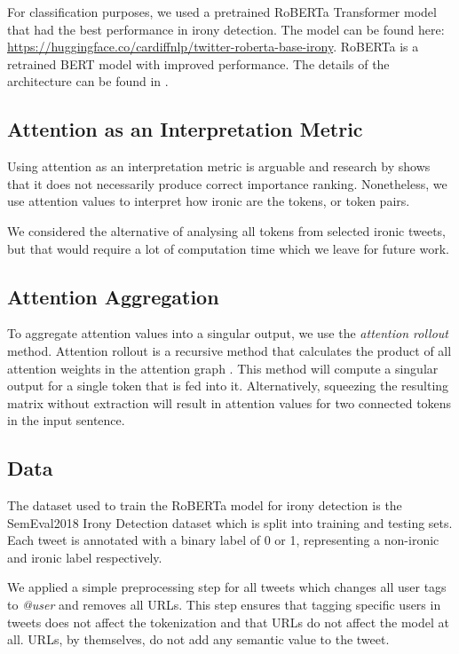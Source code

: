 \documentclass[10pt, a4paper]{article}
\begin{document}
For classification purposes, we used a pretrained RoBERTa Transformer model that had the best performance in irony detection.
The model can be found here: \url{https://huggingface.co/cardiffnlp/twitter-roberta-base-irony}.
RoBERTa is a retrained BERT model with improved performance. The details of the architecture can be found in \citep{roberta}. 

\subsection{Attention as an Interpretation Metric}

Using attention as an interpretation metric is arguable and research by \cite{attention-interpretable} shows that it does not necessarily produce correct importance ranking.
Nonetheless, we use attention values to interpret how ironic are the tokens, or token pairs.

We considered the alternative of analysing all tokens from selected ironic tweets, but that would require a lot of computation time which we leave for future work.

\subsection{Attention Aggregation}
\label{sec:attaggr}

To aggregate attention values into a singular output, we use the \textit{attention rollout} method.
Attention rollout is a recursive method that calculates the product of all attention weights in the attention graph \citep{quantifying-attention-flow}.
This method will compute a singular output for a single token that is fed into it.
Alternatively, squeezing the resulting matrix without extraction will result in attention values for two connected tokens in the input sentence.

\subsection{Data}

The dataset used to train the RoBERTa model for irony detection is the SemEval2018 Irony Detection dataset \citep{van-hee-etal-2018-semeval} which is split into training and testing sets.
Each tweet is annotated with a binary label of 0 or 1, representing a non-ironic and ironic label respectively.

We applied a simple preprocessing step for all tweets which changes all user tags to \textit{@user} and removes all URLs.
This step ensures that tagging specific users in tweets does not affect the tokenization and that URLs do not affect the model at all.
URLs, by themselves, do not add any semantic value to the tweet.
\end{document}
